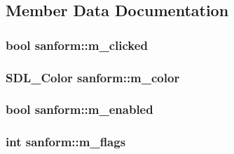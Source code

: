 \subsection{Member Data Documentation}
\hypertarget{classsanform_a02c6d5cb8db4d5f7a07a87abdeaf0d76}{}
\subsubsection[{m\+\_\+clicked}]{\setlength{\rightskip}{0pt plus 5cm}bool sanform\+::m\+\_\+clicked\hspace{0.3cm}{\ttfamily [private]}}\label{classsanform_a02c6d5cb8db4d5f7a07a87abdeaf0d76}
\hypertarget{classsanform_af56503a17f76847a65478a5d57b348a3}{}
\subsubsection[{m\+\_\+color}]{\setlength{\rightskip}{0pt plus 5cm}S\+D\+L\+\_\+\+Color sanform\+::m\+\_\+color\hspace{0.3cm}{\ttfamily [private]}}\label{classsanform_af56503a17f76847a65478a5d57b348a3}
\hypertarget{classsanform_a5187105a96c46242bed4a3247075e0cd}{}
\subsubsection[{m\+\_\+enabled}]{\setlength{\rightskip}{0pt plus 5cm}bool sanform\+::m\+\_\+enabled\hspace{0.3cm}{\ttfamily [private]}}\label{classsanform_a5187105a96c46242bed4a3247075e0cd}
\hypertarget{classsanform_a0094b6b0e4411b936e8a13226500b4d2}{}
\subsubsection[{m\+\_\+flags}]{\setlength{\rightskip}{0pt plus 5cm}int sanform\+::m\+\_\+flags\hspace{0.3cm}{\ttfamily [private]}}\label{classsanform_a0094b6b0e4411b936e8a13226500b4d2}
\hypertarget{classsanform_a41ba5ba91ae765354c620d86057fdfa2}{}

